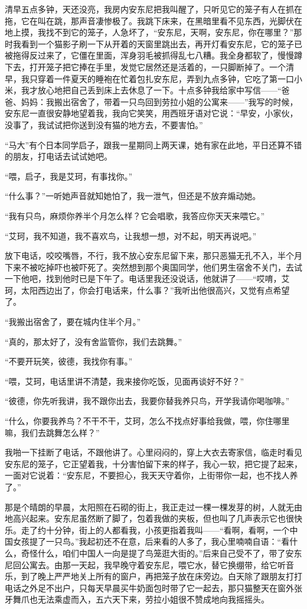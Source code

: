 \par 清早五点多钟，天还没亮，我房内安东尼把我叫醒了，只听见它的笼子有人在抓在拖，它在叫在跳，那声音凄惨极了。我跳下床来，在黑暗里看不见东西，光脚伏在地上摸，我找不到它的笼子，人急坏了，“安东尼，天啊，安东尼，你在哪里？”那时我看到一个猫影子刷一下从开着的天窗里跳出去，再开灯看安东尼，它的笼子已被拖得反过来了，它僵在里面，浑身羽毛被抓得乱七八糟。我全身都软了，慢慢蹲下去，打开笼子把它捧在手里，发觉它居然还是活着的，一只脚断掉了。一个清早，我只穿着一件夏天的睡袍在忙着包扎安东尼，弄到九点多钟，它吃了第一口小米，我才放心地把自己丢到床上去休息了一下。十点多钟我给家中写信——“爸爸、妈妈：我搬出宿舍了，带着一只鸟回到劳拉小姐的公寓来——”我写的时候，安东尼一直很安静地望着我，我向它笑笑，用西班牙语对它说：“早安，小家伙，没事了，我试试把你送到没有猫的地方去，不要害怕。”
\par “马大”有个日本同学启子，跟我一星期同上两天课，她有家在此地，平日还算不错的朋友，打电话去试试她吧。
\par “喂，启子，我是艾珂，有事找你。”
\par “什么事？”一听她声音就知她怕了，我一泄气，但还是不放弃煽动她。
\par “我有只鸟，麻烦你养半个月怎么样？它会唱歌，我答应你天天来喂它。”
\par “艾珂，我不知道，我不喜欢鸟，让我想一想，对不起，明天再说吧。”
\par 放下电话，咬咬嘴唇，不行，我不放心安东尼留下来，那只恶猫无孔不入，半个月下来不被吃掉吓也被吓死了。突然想到那个奥国同学，他们男生宿舍不关门，去试一下他吧，找到他时已是下午了。电话里我还没说话，他就讲了——“哎唷，艾珂，太阳西边出了，你会打电话来，什么事？”我听出他很高兴，又觉有点希望了。
\par “我搬出宿舍了，要在城内住半个月。”
\par “真的，那太好了，没有舍监管你，我们去跳舞。”
\par “不要开玩笑，彼德，我找你有事。”
\par “喂，艾珂，电话里讲不清楚，我来接你吃饭，见面再谈好不好？”
\par “彼德，你先听我讲，我不跟你出去，我要你替我养只鸟，开学我请你喝咖啡。”
\par “什么，你要我养鸟？不干不干，艾珂，怎么不找点好事给我做，喂，你住哪里嘛，我们去跳舞怎么样？”
\par 我啪一下挂断了电话，不跟他讲了。心里闷闷的，穿上大衣去寄家信，临走时看见安东尼的笼子，它正望着我，十分害怕留下来的样子，我心一软，把它提了起来，一面对它说着：“安东尼，不要担心，我天天守着你，上街带你一起，也不找人养了。”
\par 那是个晴朗的早晨，太阳照在石砌的街上，我正走过一棵一棵发芽的树，人就无由地高兴起来。安东尼虽然断了脚了，包着我做的夹板，但也叫了几声表示它也很快乐。走了约十分钟，街上的人都看我，小孩更指着我叫——“看啊，看啊，一个中国女孩提了一只鸟。”我起初还不在意，后来看的人多了，我心里喃喃自语：“看什么，奇怪什么，咱们中国人一向是提了鸟笼逛大街的。”后来自己受不了，带了安东尼回公寓去。由那一天起，我早晚守着安东尼，喂它水，替它换绷带，给它听音乐，到了晚上严严地关上所有的窗户，再把笼子放在床旁边。白天除了跟朋友打打电话之外足不出户，只每天早晨买牛奶面包时带了它一起去，那只猫整天在窗外张牙舞爪也无法乘虚而入，五六天下来，劳拉小姐很不赞成地向我摇摇头。
